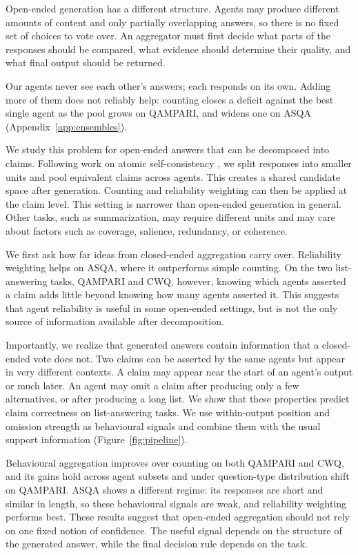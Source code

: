 \documentclass{article}
\begin{document}
Open-ended generation has a different structure. Agents may produce different amounts of content and only partially overlapping answers, so there is no fixed set of choices to vote over. An aggregator must first decide what parts of the responses should be compared, what evidence should determine their quality, and what final output should be returned.

Our agents never see each other's answers; each responds on its own. Adding more of them does not reliably help: counting closes a deficit against the best single agent as the pool grows on QAMPARI, and widens one on ASQA (Appendix~\ref{app:ensembles}).

We study this problem for open-ended answers that can be decomposed into claims. Following work on atomic self-consistency \cite{thirukovalluru2024atomic}, we split responses into smaller units and pool equivalent claims across agents. This creates a shared candidate space after generation. Counting and reliability weighting can then be applied at the claim level. This setting is narrower than open-ended generation in general. Other tasks, such as summarization, may require different units and may care about factors such as coverage, salience, redundancy, or coherence.

We first ask how far ideas from closed-ended aggregation carry over. Reliability weighting helps on ASQA, where it outperforms simple counting. On the two list-answering tasks, QAMPARI and CWQ, however, knowing which agents asserted a claim adds little beyond knowing how many agents asserted it. This suggests that agent reliability is useful in some open-ended settings, but is not the only source of information available after decomposition.

Importantly, we realize that generated answers contain information that a closed-ended vote does not. Two claims can be asserted by the same agents but appear in very different contexts. A claim may appear near the start of an agent's output or much later. An agent may omit a claim after producing only a few alternatives, or after producing a long list. We show that these properties predict claim correctness on list-answering tasks. We use within-output position and omission strength as behavioural signals and combine them with the usual support information (Figure~\ref{fig:pipeline}).

Behavioural aggregation improves over counting on both QAMPARI and CWQ, and its gains hold across agent subsets and under question-type distribution shift on QAMPARI. ASQA shows a different regime: its responses are short and similar in length, so these behavioural signals are weak, and reliability weighting performs best. These results suggest that open-ended aggregation should not rely on one fixed notion of confidence. The useful signal depends on the structure of the generated answer, while the final decision rule depends on the task.
\end{document}
